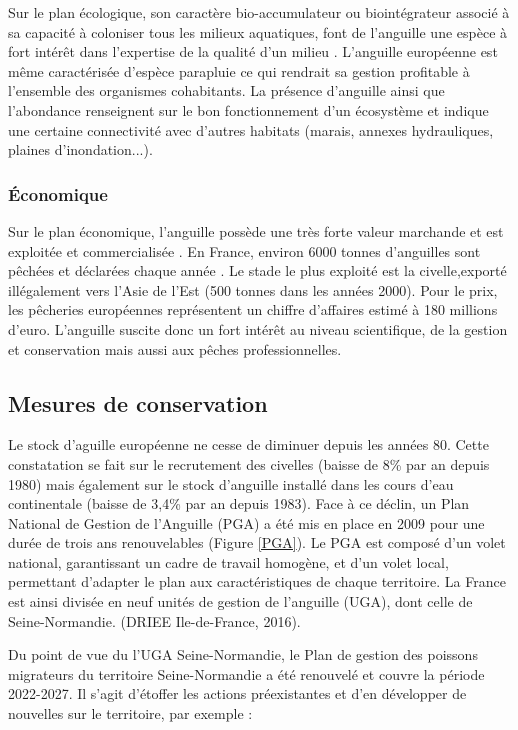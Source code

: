 \documentclass[11pt,titlepage,twoside]{article}\usepackage[]{graphicx}\usepackage[table]{xcolor}
\begin{document}
Sur le plan écologique, son caractère bio-accumulateur ou biointégrateur associé à sa capacité à coloniser tous les milieux aquatiques, font de l’anguille une espèce à fort intérêt dans l’expertise de la qualité d’un milieu \citep{laffaille_role_2000}. L’anguille européenne est même caractérisée d’espèce parapluie ce qui rendrait sa gestion profitable à l'ensemble des organismes cohabitants. La présence d’anguille ainsi que l’abondance renseignent sur le bon fonctionnement d’un écosystème et indique une certaine connectivité avec d’autres habitats (marais, annexes hydrauliques, plaines d’inondation...).


\subsubsection{Économique }

Sur le plan économique, l’anguille possède une très forte valeur marchande et est exploitée et commercialisée \citep{elie_migration_1994}.  En France, environ 6000 tonnes d’anguilles sont pêchées et déclarées chaque année \citep{baisez_outil_2005}. Le stade le plus exploité est la civelle,exporté illégalement vers l’Asie de l’Est (500 tonnes dans les années 2000). Pour le prix, les pêcheries européennes représentent un chiffre d'affaires estimé à 180 millions d'euro\citep{laffaille_role_2000}. L'anguille suscite donc un fort intérêt au niveau scientifique, de la gestion et conservation mais aussi aux pêches professionnelles.


\subsection{Mesures de conservation}

Le stock d’aguille européenne ne cesse de diminuer depuis les années 80. Cette constatation se fait sur le recrutement des civelles (baisse de 8\% par an depuis 1980) mais également sur le stock d’anguille installé dans les cours d’eau continentale (baisse de 3,4\% par an depuis 1983). Face à ce déclin, un Plan National de Gestion de l'Anguille (PGA) a été mis en place en 2009 pour une durée de trois ans renouvelables (Figure \ref{PGA}). Le PGA est composé d’un volet national, garantissant un cadre de travail homogène, et d’un volet local, permettant d’adapter le plan aux caractéristiques de chaque territoire. La France est ainsi divisée en neuf unités de gestion de l’anguille (UGA), dont celle de Seine-Normandie. (DRIEE Ile-de-France, 2016). 

Du point de vue du l’UGA Seine-Normandie, le Plan de gestion des poissons migrateurs du territoire Seine-Normandie a été renouvelé et couvre la période 2022-2027. Il s’agit d’étoffer les actions préexistantes et d’en développer de nouvelles sur le territoire, par exemple :
\end{document}
